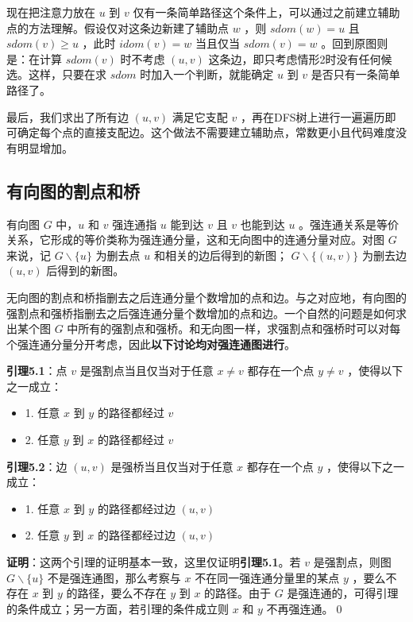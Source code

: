 \documentclass{noithesis}
\begin{document}
现在把注意力放在 $u$ 到 $v$ 仅有一条简单路径这个条件上，可以通过之前建立辅助点的方法理解。假设仅对这条边新建了辅助点 $w$ ，则 $sdom(w) = u$ 且 $sdom(v) \ge u$ ，此时 $idom(v) = w$ 当且仅当 $sdom(v) = w$ 。回到原图则是：在计算 $sdom(v)$ 时不考虑 $(u,v)$ 这条边，即只考虑情形2时没有任何候选。这样，只要在求 $sdom$ 时加入一个判断，就能确定 $u$ 到 $v$ 是否只有一条简单路径了。

最后，我们求出了所有边 $(u,v)$ 满足它支配 $v$ ，再在DFS树上进行一遍遍历即可确定每个点的直接支配边。这个做法不需要建立辅助点，常数更小且代码难度没有明显增加。

\subsection{有向图的割点和桥}

有向图 $G$ 中，$u$ 和 $v$ 强连通指 $u$ 能到达 $v$ 且 $v$ 也能到达 $u$ 。强连通关系是等价关系，它形成的等价类称为强连通分量，这和无向图中的连通分量对应。对图 $G$ 来说，记 $G\backslash\{u\}$ 为删去点 $u$ 和相关的边后得到的新图； $G\backslash\{(u,v)\}$ 为删去边 $(u,v)$ 后得到的新图。

无向图的割点和桥指删去之后连通分量个数增加的点和边。与之对应地，有向图的强割点和强桥指删去之后强连通分量个数增加的点和边。一个自然的问题是如何求出某个图 $G$ 中所有的强割点和强桥。和无向图一样，求强割点和强桥时可以对每个强连通分量分开考虑，因此\textbf{以下讨论均对强连通图进行}。

\textbf{引理5.1}：点 $v$ 是强割点当且仅当对于任意 $x\neq v$ 都存在一个点 $y\neq v$ ，使得以下之一成立：

\begin{itemize}
	\item 1. 任意 $x$ 到 $y$ 的路径都经过 $v$
	\item 2. 任意 $y$ 到 $x$ 的路径都经过 $v$
\end{itemize}

\textbf{引理5.2}：边 $(u, v)$ 是强桥当且仅当对于任意 $x$ 都存在一个点 $y$ ，使得以下之一成立：

\begin{itemize}
	\item 1. 任意 $x$ 到 $y$ 的路径都经过边 $(u,v)$
	\item 2. 任意 $y$ 到 $x$ 的路径都经过边 $(u,v)$
\end{itemize}

\textbf{证明}：这两个引理的证明基本一致，这里仅证明\textbf{引理5.1}。若 $v$ 是强割点，则图 $G\backslash\{u\}$ 不是强连通图，那么考察与 $x$ 不在同一强连通分量里的某点 $y$ ，要么不存在 $x$ 到 $y$ 的路径，要么不存在 $y$ 到 $x$ 的路径。由于 $G$ 是强连通的，可得引理的条件成立；另一方面，若引理的条件成立则 $x$ 和 $y$ 不再强连通。\qed
\end{document}
